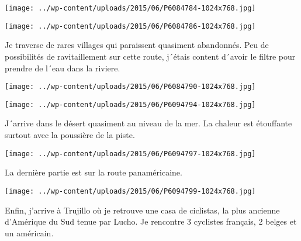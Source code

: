 \begin{center} \texttt{[image: ../wp-content/uploads/2015/06/P6084784-1024x768.jpg]} \end{center}

 

 

\begin{center} \texttt{[image: ../wp-content/uploads/2015/06/P6084786-1024x768.jpg]} \end{center}

 

 Je traverse de rares villages qui paraissent quasiment abandonnés. Peu de possibilités de ravitaillement sur cette route, j´étais content d´avoir le filtre pour prendre de l´eau dans la riviere. 

 

\begin{center} \texttt{[image: ../wp-content/uploads/2015/06/P6084790-1024x768.jpg]} \end{center}

 

 

\begin{center} \texttt{[image: ../wp-content/uploads/2015/06/P6094794-1024x768.jpg]} \end{center}

 

 J´arrive dans le désert quasiment au niveau de la mer. La chaleur est étouffante surtout avec la poussière de la piste. 

 

\begin{center} \texttt{[image: ../wp-content/uploads/2015/06/P6094797-1024x768.jpg]} \end{center}

 

 La dernière partie est sur la route panaméricaine. 

 

\begin{center} \texttt{[image: ../wp-content/uploads/2015/06/P6094799-1024x768.jpg]} \end{center}

 

 Enfin, j'arrive à Trujillo où je retrouve une casa de ciclistas, la plus ancienne d'Amérique du Sud tenue par Lucho. Je rencontre 3 cyclistes français, 2 belges et un américain. 

 

